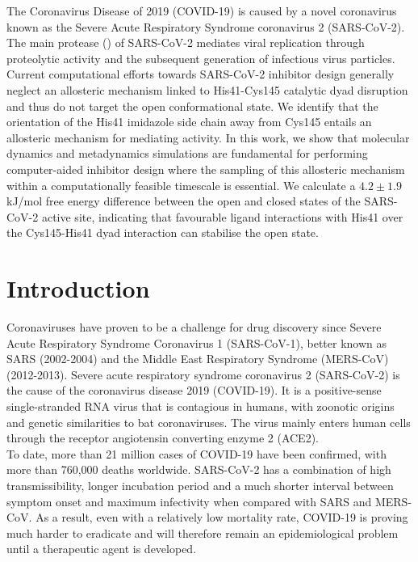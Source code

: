 The Coronavirus Disease of 2019 (COVID-19) is caused by a novel coronavirus known as the Severe Acute Respiratory Syndrome coronavirus 2 (SARS-CoV-2). The main protease (\!\!) of SARS-CoV-2 mediates viral replication through proteolytic activity and the subsequent generation of infectious virus particles. Current computational efforts towards SARS-CoV-2  inhibitor design generally neglect an allosteric mechanism linked to His41-Cys145 catalytic dyad disruption and thus do not target the open conformational state. We identify that the orientation of the His41 imidazole side chain away from Cys145 entails an allosteric mechanism for mediating  activity. In this work, we show that molecular dynamics and metadynamics simulations are fundamental for performing computer-aided  inhibitor design where the sampling of this allosteric mechanism within a computationally feasible timescale is essential. We calculate a $4.2 \pm 1.9$ kJ/mol free energy difference between the open and closed states of the SARS-CoV-2  active site, indicating that favourable ligand interactions with His41 over the Cys145-His41 dyad interaction can stabilise the open state.

\section{Introduction}
Coronaviruses have proven to be a challenge for drug discovery since Severe Acute Respiratory Syndrome Coronavirus 1 (SARS-CoV-1), better known as SARS (2002-2004) and the Middle East Respiratory Syndrome (MERS-CoV) (2012-2013). Severe acute respiratory syndrome coronavirus 2 (SARS-CoV-2) is the cause of the coronavirus disease 2019 (COVID-19). It is a positive-sense single-stranded RNA virus that is contagious in humans, with zoonotic origins and genetic similarities to bat coronaviruses.\cite{andersen2020proximal} The virus mainly enters human cells through the receptor angiotensin converting enzyme 2 (ACE2).\cite{shang2020structural} \\

To date, more than 21 million cases of COVID-19 have been confirmed, with more than 760,000 deaths worldwide.\cite{whoreport} SARS-CoV-2 has a combination of high transmissibility, longer incubation period and a much shorter interval between symptom onset and maximum infectivity when compared with SARS and MERS-CoV.\cite{petersen2020comparing} As a result, even with a relatively low mortality rate, COVID-19 is proving much harder to eradicate and will therefore remain an epidemiological problem until a therapeutic agent is developed.\\

